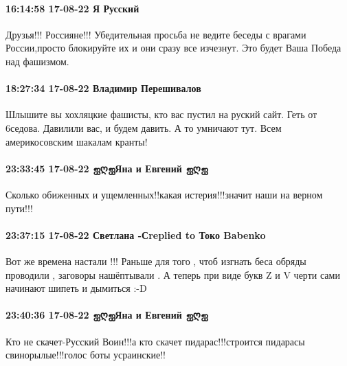  
 
 
 
 

\paragraph{16:14:58 17-08-22 Я Русский}

Друзья!!! Россияне!!! Убедительная просьба не ведите беседы с врагами
России,просто блокируйте их и они сразу все изчезнут. Это будет Ваша Победа над
фашизмом.

\paragraph{18:27:34 17-08-22 Владимир Перешивалов}

Шлышите вы хохляцкие фашисты, кто вас пустил на руский сайт. Геть от 6седова.
Давилили вас, и будем давить. А то умничают тут. Всем америкосовским шакалам
кранты!

\paragraph{23:33:45 17-08-22 ஐღஐЯна и Евгений ஐღஐ}

Сколько обиженных и ущемленных!!какая истерия!!!значит наши на верном пути!!!

\paragraph{23:37:15 17-08-22 Светлана -Сreplied to Токо Babenko}

Вот же времена настали !!! Раньше для того , чтоб изгнать беса обряды проводили
, заговоры нашёптывали . А теперь при виде букв Z и V черти сами начинают
шипеть и дымиться :-D

\paragraph{23:40:36 17-08-22 ஐღஐЯна и Евгений ஐღஐ}

Кто не скачет-Русский Воин!!!а кто скачет пидарас!!!строится пидарасы
свинорылые!!!голос боты усраинские!!
